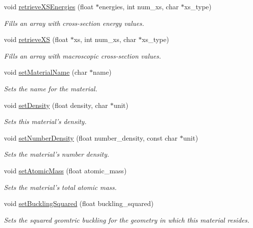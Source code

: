 \begin{DoxyCompactItemize}
void \hyperlink{classMaterial_a01e69f371011e7c80b1f8ba9c3b57204}{retrieve\-X\-S\-Energies} (float $\ast$energies, int num\-\_\-xs, char $\ast$xs\-\_\-type)
\begin{DoxyCompactList}\small\item\em Fills an array with cross-\/section energy values. \end{DoxyCompactList}\item 
void \hyperlink{classMaterial_ab5b5e2078eddb057841b77ccd4110071}{retrieve\-X\-S} (float $\ast$xs, int num\-\_\-xs, char $\ast$xs\-\_\-type)
\begin{DoxyCompactList}\small\item\em Fills an array with macroscopic cross-\/section values. \end{DoxyCompactList}\item 
void \hyperlink{classMaterial_a89e56bc82fcefcd2c73ab4a525a00129}{set\-Material\-Name} (char $\ast$name)
\begin{DoxyCompactList}\small\item\em Sets the name for the material. \end{DoxyCompactList}\item 
void \hyperlink{classMaterial_a24c5b8d61359fd8a9843c3e71f286e01}{set\-Density} (float density, char $\ast$unit)
\begin{DoxyCompactList}\small\item\em Sets this material's density. \end{DoxyCompactList}\item 
void \hyperlink{classMaterial_a32dbf4399d348901aefc4721a891337b}{set\-Number\-Density} (float number\-\_\-density, const char $\ast$unit)
\begin{DoxyCompactList}\small\item\em Sets the material's number density. \end{DoxyCompactList}\item 
void \hyperlink{classMaterial_a25785b407a07d9509458cdd342aef877}{set\-Atomic\-Mass} (float atomic\-\_\-mass)
\begin{DoxyCompactList}\small\item\em Sets the material's total atomic mass. \end{DoxyCompactList}\item 
void \hyperlink{classMaterial_aeebedf71fc23735ed99c5ab3f5728b25}{set\-Buckling\-Squared} (float buckling\-\_\-squared)
\begin{DoxyCompactList}\small\item\em Sets the squared geomtric buckling for the geometry in which this material resides. \end{DoxyCompactList}\item 

\end{DoxyCompactItemize}
